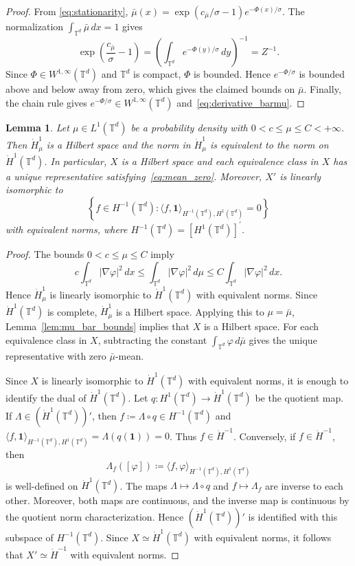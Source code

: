 \documentclass[11pt]{article}
\numberwithin{equation}{section}
\newtheorem{lemma}[theorem]{Lemma}
\theoremstyle{definition}
\newcommand{\T}{\mathbb{T}}
\newcommand{\potential}[1][\mu]{\dot{H}^1_{#1}}
\newcommand{\dotHk}[1][k]{\dot{H}^{#1}}
\newcommand{\dotHminusone}{\dot{H}^{-1}}
\newcommand{\constants}{\mathbf{1}}
\begin{document}
\begin{proof}
    From \eqref{eq:stationarity}, $\bar\mu(x) = \exp(c_{\bar\mu} / \sigma - 1) e^{-\Phi(x)/\sigma}$.
    The normalization $\int_{\T^d} \bar\mu\,dx = 1$ gives
    \[
    \exp\left(\frac{c_{\bar\mu}}{\sigma}-1\right) = \left(\int_{\T^d} e^{-\Phi(y)/\sigma}\,dy\right)^{-1} = Z^{-1}.
    \]
    Since $\Phi \in W^{1,\infty}(\T^d)$ and $\T^d$ is compact, $\Phi$ is bounded. 
    Hence $e^{-\Phi/\sigma}$ is bounded above and below away from zero, which gives the claimed bounds on $\bar\mu$. 
    Finally, the chain rule gives $e^{-\Phi/\sigma} \in W^{1,\infty}(\T^d)$ and~\eqref{eq:derivative_barmu}.
\end{proof}

\begin{lemma}
\label{lem:hilbert_structure}
    Let $\mu \in L^1(\T^d)$ be a probability density with $0 < c \le \mu \le C < +\infty$.
    Then $\potential$ is a Hilbert space and the norm in $\potential$ is equivalent to the norm on $\dotHk[1](\T^d)$.
    In particular, $X$ is a Hilbert space and each equivalence class in $X$ has a unique representative satisfying~\eqref{eq:mean_zero}.
    Moreover, $X'$ is linearly isomorphic to
    \[
    \left\{f\in H^{-1}(\T^d) : \langle f, \constants \rangle_{H^{-1}(\T^d), H^1(\T^d)} = 0 \right\} 
    \]
    with equivalent norms, where $H^{-1}(\T^d) = [H^1(\T^d)]^\prime$.
\end{lemma}

\begin{proof}
    The bounds $0 < c \le \mu \le C$ imply
    \[ 
    c\int_{\T^d} |\nabla\varphi|^2\,dx \le \int_{\T^d} |\nabla\varphi|^2\,d\mu \le C\int_{\T^d} |\nabla\varphi|^2\,dx.
    \]
    Hence $\potential$ is linearly isomorphic to $\dotHk[1](\T^d)$ with equivalent norms. 
    Since $\dotHk[1](\T^d)$ is complete, $\potential$ is a Hilbert space.
    Applying this to $\mu = \bar\mu$, Lemma~\ref{lem:mu_bar_bounds} implies that $X$ is a Hilbert space.
    For each equivalence class in $X$, subtracting the constant $\int_{\T^d} \varphi \, d\bar\mu$ gives the unique representative with zero $\bar\mu$-mean.

    Since $X$ is linearly isomorphic to $\dotHk[1](\T^d)$ with equivalent norms, it is enough to identify the dual of $\dotHk[1](\T^d)$.
    Let $q : H^1(\T^d) \to \dotHk[1](\T^d)$ be the quotient map.
    If $\Lambda \in (\dotHk[1](\T^d))'$, then $f \coloneqq \Lambda \circ q \in H^{-1}(\T^d)$ and $\langle f, \constants \rangle_{H^{-1}(\T^d), H^1(\T^d)} = \Lambda(q(\constants)) = 0$.
    Thus $f\in \dotHminusone$.
    Conversely, if $f \in \dotHminusone$, then
    \[
    \Lambda_f([\varphi]) \coloneqq \langle f,\varphi\rangle_{H^{-1}(\T^d), H^1(\T^d)}
    \]
    is well-defined on $\dotHk[1](\T^d)$.
    The maps $\Lambda \mapsto \Lambda \circ q$ and $f \mapsto \Lambda_f$ are inverse to each other.
    Moreover, both maps are continuous, and the inverse map is continuous by the quotient norm characterization.
    Hence $(\dotHk[1](\T^d))'$ is identified with this subspace of $H^{-1}(\T^d)$.
    Since $X \simeq \dotHk[1](\T^d)$ with equivalent norms, it follows that $X' \simeq \dotHminusone$ with equivalent norms.
\end{proof}
\end{document}
